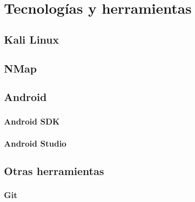 \chapter{Tecnologías y herramientas}

\section{Kali Linux}

\section{NMap}

\section{Android}

\subsection{Android SDK}

\subsection{Android Studio}

\section{Otras herramientas}

\subsection{Git}